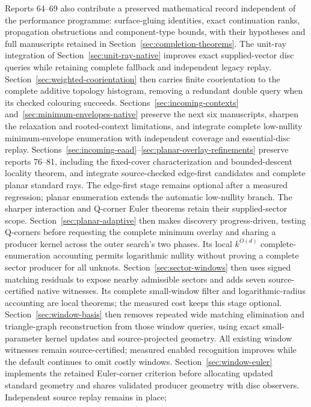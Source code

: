 \documentclass[11pt]{article}
\theoremstyle{remark}
\begin{document}
Reports 64--69 also contribute a preserved mathematical record independent
of the performance programme: surface-gluing identities, exact continuation
ranks, propagation obstructions and component-type bounds, with their
hypotheses and full manuscripts retained in
Section~\ref{sec:completion-theorems}. The unit-ray integration of
Section~\ref{sec:unit-ray-native} improves exact supplied-vector disc queries
while retaining complete fallback and independent legacy replay.
Section~\ref{sec:weighted-coorientation} then carries finite coorientation
to the complete additive topology histogram, removing a redundant double
query when its checked colouring succeeds.
Sections~\ref{sec:incoming-contexts} and~\ref{sec:minimum-envelopes-native}
preserve the next six manuscripts, sharpen the relaxation and rooted-context
limitations, and integrate complete low-nullity minimum-envelope enumeration
with independent coverage and essential-disc replay.
Sections~\ref{sec:incoming-eaad}--\ref{sec:planar-overlay-refinements}
preserve reports 76--81, including the fixed-cover characterization and
bounded-descent locality theorem, and integrate source-checked edge-first
candidates and complete planar standard rays. The edge-first stage remains
optional after a measured regression; planar enumeration extends the
automatic low-nullity branch. The sharper interaction and Q-corner Euler
theorems retain their supplied-sector scope.
Section~\ref{sec:planar-adaptive} then makes discovery progress-driven,
testing Q-corners before requesting the complete minimum overlay and
sharing a producer kernel across the outer search's two phases. Its
local $k^{O(d)}$ complete-enumeration accounting permits logarithmic
nullity without proving a complete sector producer for all unknots.
Section~\ref{sec:sector-windows} then uses signed matching residuals to
expose nearby admissible sectors and adds seven source-certified native
witnesses. Its complete small-window filter and logarithmic-radius
accounting are local theorems; the measured cost keeps this stage optional.
Section~\ref{sec:window-basis} then removes repeated wide matching
elimination and triangle-graph reconstruction from those window queries,
using exact small-parameter kernel updates and source-projected geometry.
All existing window witnesses remain source-certified; measured enabled
recognition improves while the default continues to omit costly windows.
Section~\ref{sec:window-euler} implements the retained Euler-corner criterion
before allocating updated standard geometry and shares validated producer
geometry with disc observers. Independent source replay remains in place;
\end{document}
